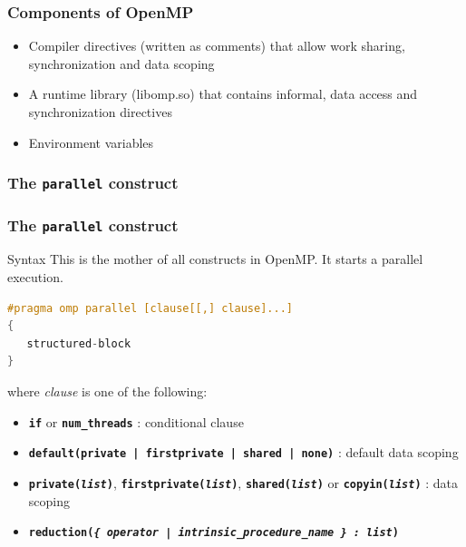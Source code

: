 \begin{frame}[containsverbatim]
  \frametitle{Components of OpenMP}
  \begin{itemize}
  \item{Compiler directives (written as comments) that allow work sharing, synchronization and data scoping}
  \item{A runtime library (libomp.so) that contains informal, data access and synchronization directives}
  \item{Environment variables}
  \end{itemize}
\end{frame}


\subsubsection{The \texttt{parallel} construct}


\begin{frame}[containsverbatim]
  \frametitle{The \texttt{parallel} construct}

  \begin{exampleblock}{Syntax}
    This is the mother of all constructs in OpenMP. It starts a parallel execution.
    \begin{lstlisting}[language=C,frame=lines]
#pragma omp parallel [clause[[,] clause]...]
{
   structured-block
}
\end{lstlisting}
    where \textit{clause} is one of the following:
    \begin{itemize}
    \item \textbf{\texttt{if}} or \textbf{\texttt{num\_threads}} : conditional clause
    \item \textbf{\texttt{default(private | firstprivate | shared | none)}} : default data scoping
    \item \textbf{\texttt{private(\textit{list})}}, \textbf{\texttt{firstprivate(\textit{list})}}, \textbf{\texttt{shared(\textit{list})}} or \textbf{\texttt{copyin(\textit{list})}} : data scoping
    \item \textbf{\texttt{reduction(\textit{\{ operator | intrinsic\_procedure\_name \} : list})}}
    \end{itemize}
  \end{exampleblock}
\end{frame}


